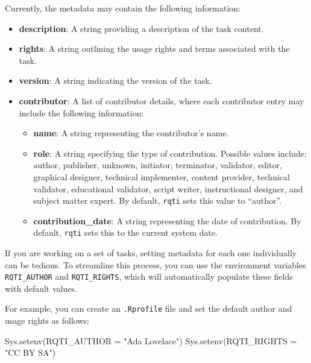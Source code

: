 \documentclass[twoside]{tufte-book}
\newenvironment{Shaded}{}{}
\newcommand{\AttributeTok}[1]{\textcolor[rgb]{0.49,0.56,0.16}{#1}}
\newcommand{\FunctionTok}[1]{\textcolor[rgb]{0.02,0.16,0.49}{#1}}
\newcommand{\NormalTok}[1]{#1}
\newcommand{\StringTok}[1]{\textcolor[rgb]{0.25,0.44,0.63}{#1}}
\providecommand{\tightlist}{%
  \setlength{\itemsep}{0pt}\setlength{\parskip}{0pt}}
\begin{document}
Currently, the metadata may contain the following information:

\begin{itemize}
\tightlist
\item
  \textbf{description}: A string providing a description of the task content.
\item
  \textbf{rights}: A string outlining the usage rights and terms associated with the task.
\item
  \textbf{version}: A string indicating the version of the task.
\item
  \textbf{contributor}: A list of contributor details, where each contributor entry may include the following information:

  \begin{itemize}
  \tightlist
  \item
    \textbf{name}: A string representing the contributor's name.
  \item
    \textbf{role}: A string specifying the type of contribution. Possible values include: author, publisher, unknown, initiator, terminator, validator, editor, graphical designer, technical implementer, content provider, technical validator, educational validator, script writer, instructional designer, and subject matter expert. By default, \texttt{rqti} sets this value to ``author''.
  \item
    \textbf{contribution\_date}: A string representing the date of contribution. By default, \texttt{rqti} sets this to the current system date.
  \end{itemize}
\end{itemize}

If you are working on a set of tasks, setting metadata for each one individually can be tedious. To streamline this process, you can use the environment variables \texttt{RQTI\_AUTHOR} and \texttt{RQTI\_RIGHTS}, which will automatically populate these fields with default values.

For example, you can create an \texttt{.Rprofile} file and set the default author and usage rights as follows:

\begin{Shaded}
\begin{Highlighting}[]
\FunctionTok{Sys.setenv}\NormalTok{(}\AttributeTok{RQTI\_AUTHOR =} \StringTok{"Ada Lovelace"}\NormalTok{)}
\FunctionTok{Sys.setenv}\NormalTok{(}\AttributeTok{RQTI\_RIGHTS =} \StringTok{"CC BY SA"}\NormalTok{)}
\end{Highlighting}
\end{Shaded}
\end{document}

